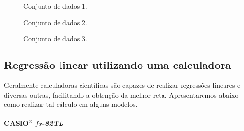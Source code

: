 \begin{figure*}
\centering
\forcerectofloat

\caption{Conjunto de dados 1.}
\label{RetasConjuntosDados1}
\end{figure*}

\begin{figure*}
\centering
\forcerectofloat

\caption{Conjunto de dados 2.}
\label{RetasConjuntosDados2}
\end{figure*}

\begin{figure*}


\centering
\caption{Conjunto de dados 3.}
\label{RetasConjuntosDados3}
\end{figure*}

\pagebreak
\subsection{Regressão linear utilizando uma calculadora}

Geralmente calculadoras científicas são capazes de realizar regressões lineares e diversas outras, facilitando a obtenção da melhor reta. Apresentaremos abaixo como realizar tal cálculo em alguns modelos.

\paragraph{CASIO$^{\circledR}$ $fx$-\textit{82TL}}

